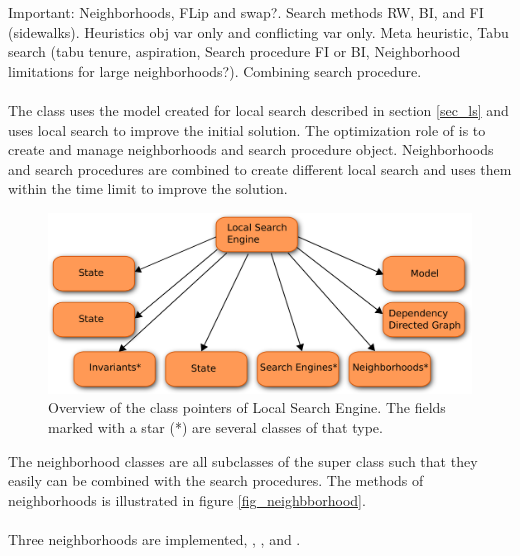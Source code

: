 Important: Neighborhoods, FLip and swap?. Search methods RW, BI, and FI (sidewalks). Heuristics obj var only and 
conflicting var only. Meta heuristic, Tabu search (tabu tenure, aspiration, Search procedure FI or BI, Neighborhood 
limitations for large neighborhoods?). Combining search procedure.  \\ \\ 
The  class uses the model created for local search described in section \ref{sec_ls} and 
uses local search to improve the initial solution. The optimization role of  is to create 
and manage neighborhoods and search procedure object. Neighborhoods and search procedures are combined to create 
different local search and  uses them within the time limit to improve the solution. \\ 
\begin{figure}[!b]
\begin{center}
\includegraphics[width=0.9\linewidth]{LSE}\caption{Overview of the class pointers of Local Search Engine. The fields 
marked with a star (*) are several classes of that type.} 
\label{fig_lse}
\end{center}
\end{figure}
The neighborhood classes are all subclasses of the super class  such that they easily can be 
combined with the search procedures. The methods of neighborhoods is illustrated in figure \ref{fig_neighbborhood}. \\
 \\ 
Three neighborhoods are implemented, , , and 
. 

